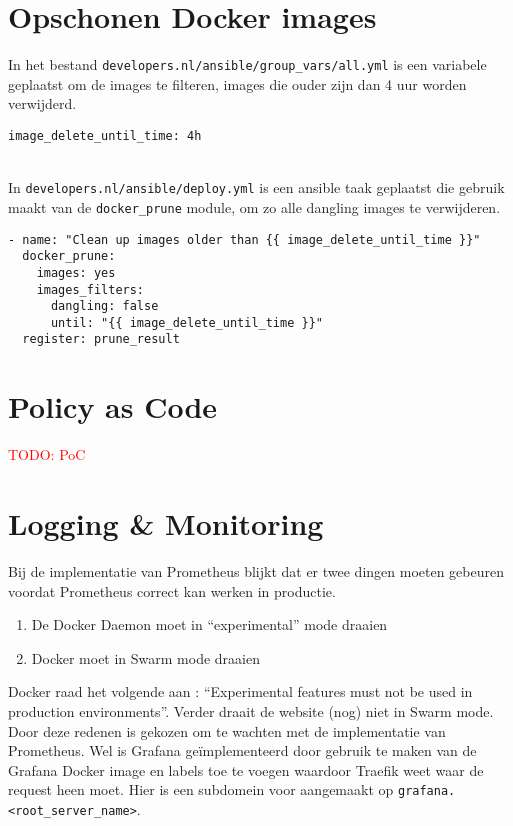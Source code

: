 \section{Opschonen Docker images}
In het bestand \texttt{developers.nl/ansible/group\_vars/all.yml} is een variabele geplaatst om de images te filteren, images die ouder zijn dan 4 uur worden verwijderd.
\begin{verbatim}
image_delete_until_time: 4h
\end{verbatim}
\\In \texttt{developers.nl/ansible/deploy.yml} is een ansible taak geplaatst die gebruik maakt van de \texttt{docker\_prune} module, om zo alle dangling images te verwijderen.
\begin{verbatim}
- name: "Clean up images older than {{ image_delete_until_time }}"
  docker_prune:
    images: yes
    images_filters:
      dangling: false
      until: "{{ image_delete_until_time }}"
  register: prune_result
\end{verbatim}

\section{Policy as Code}

\textcolor{red}{TODO: PoC} %

\section{Logging \& Monitoring}
Bij de implementatie van Prometheus blijkt dat er twee dingen moeten gebeuren voordat Prometheus correct kan werken in productie. 
\begin{enumerate}
    \item De Docker Daemon moet in \enquote{experimental} mode draaien
    \item Docker moet in Swarm mode draaien
\end{enumerate}
Docker raad het volgende aan \parencite{DockerExperimental}: \enquote{Experimental features must not be used in production environments}. Verder draait de website (nog) niet in Swarm mode. Door deze redenen is gekozen om te wachten met de implementatie van Prometheus. Wel is Grafana geïmplementeerd door gebruik te maken van de Grafana Docker image en labels toe te voegen waardoor Traefik weet waar de request heen moet. Hier is een subdomein voor aangemaakt op \texttt{grafana.<root\_server\_name>}.